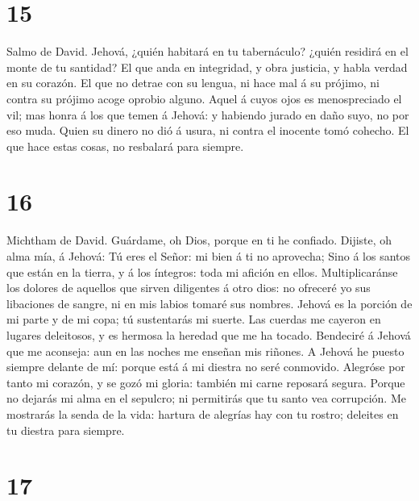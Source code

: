 \hypertarget{section-14}{%
\section{15}\label{section-14}}

 Salmo de David. Jehová, ¿quién habitará en tu
tabernáculo? ¿quién residirá en el monte de tu santidad? 
El que anda en integridad, y obra justicia, y habla verdad en su
corazón.  El que no detrae con su lengua, ni hace mal á su
prójimo, ni contra su prójimo acoge oprobio alguno.  Aquel
á cuyos ojos es menospreciado el vil; mas honra á los que temen á
Jehová: y habiendo jurado en daño suyo, no por eso muda. 
Quien su dinero no dió á usura, ni contra el inocente tomó cohecho. El
que hace estas cosas, no resbalará para siempre.

\hypertarget{section-15}{%
\section{16}\label{section-15}}

 Michtham de David. Guárdame, oh Dios, porque en ti he
confiado.  Dijiste, oh alma mía, á Jehová: Tú eres el
Señor: mi bien á ti no aprovecha;  Sino á los santos que
están en la tierra, y á los íntegros: toda mi afición en ellos.
 Multiplicaránse los dolores de aquellos que sirven
diligentes á otro dios: no ofreceré yo sus libaciones de sangre, ni en
mis labios tomaré sus nombres.  Jehová es la porción de mi
parte y de mi copa; tú sustentarás mi suerte.  Las cuerdas
me cayeron en lugares deleitosos, y es hermosa la heredad que me ha
tocado.  Bendeciré á Jehová que me aconseja: aun en las
noches me enseñan mis riñones.  A Jehová he puesto siempre
delante de mí: porque está á mi diestra no seré conmovido.
 Alegróse por tanto mi corazón, y se gozó mi gloria:
también mi carne reposará segura.  Porque no dejarás mi
alma en el sepulcro; ni permitirás que tu santo vea corrupción.
 Me mostrarás la senda de la vida: hartura de alegrías
hay con tu rostro; deleites en tu diestra para siempre.

\hypertarget{section-16}{%
\section{17}\label{section-16}}

